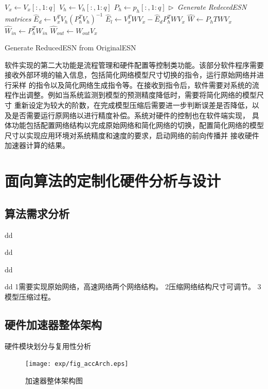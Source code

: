 \begin{algorithm}

 $V_x \leftarrow V_x[:,1:q]$	\;
 $V_h \leftarrow V_h[:,1:q]$	\;
 $P_h \leftarrow p_h[:,1:q]$	\;
 \emph{$\triangleright$\ Generate RedecedESN matrices	}	\;
$\widehat{E}_d \leftarrow V_x^T V_h (P_h^T V_h)^{-1}$	\;
$\widehat{E}_l \leftarrow V_x^T W V_x - \widehat{E}_d P_h^T W V_x$	\;
$\widehat{W} \leftarrow P_hT W V_x$	\;
$\widehat{W}_{in} \leftarrow P_h^T W_{in}$	\;
$\widehat{W}_{out} \leftarrow W_{out}V_x$	\;

 \caption{Generate ReducedESN from OriginalESN}
 \label{alg:GenESN}
\end{algorithm}
软件实现的第二大功能是流程管理和硬件配置等控制类功能。该部分软件程序需要接收外部环境的输入信息，包括简化网络模型尺寸切换的指令，运行原始网络并进行采样
的指令以及简化网络生成指令等。在接收到指令后，软件需要对系统的流程作出调整。例如当系统监测到模型的预测精度降低时，需要将简化网络的模型尺寸
重新设定为较大的阶数，在完成模型压缩后需要进一步判断误差是否降低，以及是否需要运行原网络以进行精度补偿。系统对硬件的控制也在软件端实现，
具体功能包括配置网络结构以完成原始网络和简化网络的切换，配置简化网络的模型尺寸以实现应用环境对系统精度和速度的要求，启动网络的前向传播并
接收硬件加速器计算的结果。

\section{面向算法的定制化硬件分析与设计}
\subsection{算法需求分析}
dd

dd

dd

dd
1需要实现原始网络，高速网络两个网络结构。
2压缩网络结构尺寸可调节。
3模型压缩过程。

\subsection{硬件加速器整体架构}
硬件模块划分与复用性分析
\begin{figure}
	\centering
	\texttt{[image: exp/fig\_accArch.eps]}
	\caption{加速器整体架构图}
	\label{fig:accArch}
\end{figure}
